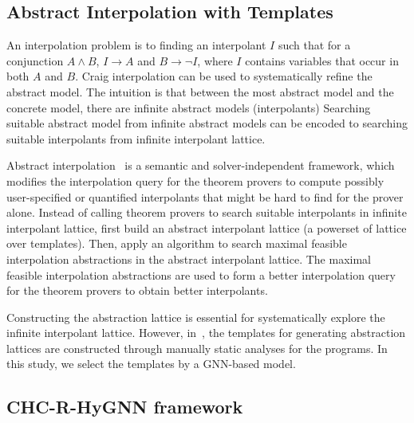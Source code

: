 \subsection{Abstract Interpolation with Templates}

An interpolation problem is to finding an interpolant $I$ such that for a conjunction $A\wedge B$, $I\rightarrow A$ and $B\rightarrow \neg I$, where $I$ contains variables that occur in both $A$ and $B$.
%
Craig interpolation can be used to systematically
refine the abstract model.
%
The intuition is that between the most abstract model and the concrete model, there are infinite abstract models (interpolants)
%
Searching suitable abstract model from infinite abstract models can be encoded to searching suitable interpolants from infinite interpolant lattice.
 
 
Abstract interpolation~\cite{Leroux2016} is a semantic and solver-independent framework, which modifies the interpolation query for the theorem provers to compute 
possibly user-specified or quantified interpolants that might be hard to find for the prover alone.
%
Instead of calling theorem provers to search suitable interpolants in infinite interpolant lattice, \cite{Leroux2016} first build an abstract interpolant lattice (a powerset of lattice over templates).
%
Then, apply an algorithm to search maximal feasible interpolation abstractions in the abstract interpolant lattice.
%
The maximal feasible interpolation abstractions are used to form a better interpolation query for the theorem provers to obtain better interpolants. 


Constructing the abstraction lattice is essential for systematically explore the infinite interpolant lattice.
%
However, in~\cite{Leroux2016,10.1007/978-3-319-57288-8_18}, the templates for generating abstraction lattices are constructed through manually static analyses for the programs.
%
In this study, we select the templates by a GNN-based model.


\subsection{CHC-R-HyGNN framework~\cite{tech-report}}
